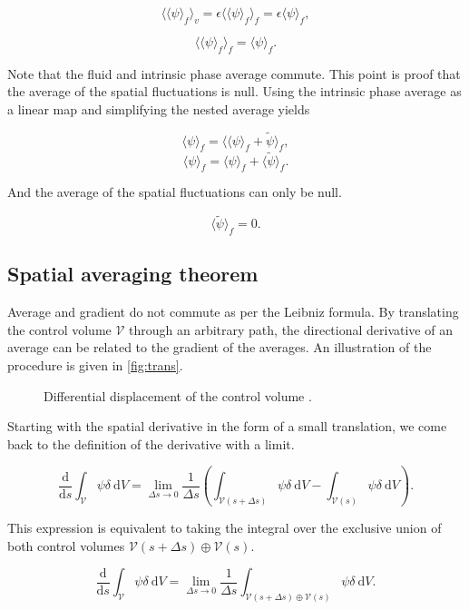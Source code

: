 \documentclass[a4paper,11pt]{article}
\begin{document}
$$\langle\langle\psi\rangle_f\rangle_v = \epsilon\langle\langle\psi\rangle_f\rangle_f = \epsilon\langle\psi\rangle_f,$$

$$\langle\langle\psi\rangle_f\rangle_f = \langle\psi\rangle_f.$$

Note that the fluid and intrinsic phase average commute. This point is proof that the average of the spatial fluctuations is null.
Using the intrinsic phase average as a linear map and simplifying the nested average yields

$$\langle\psi\rangle_f = \langle\langle\psi\rangle_f + \tilde\psi\rangle_f,$$
$$\langle\psi\rangle_f = \langle\psi\rangle_f + \langle\tilde\psi\rangle_f.$$

And the average of the spatial fluctuations can only be null.

\begin{equation}\label{eq:average-fluctuation}
  \boxed{\langle\tilde\psi\rangle_f=0.}
\end{equation}

\subsection{Spatial averaging theorem}

Average and gradient do not commute as per the Leibniz formula.
By translating the control volume $\mathcal V$ through an arbitrary path, the directional derivative of an average can be related to the gradient of the averages.
An illustration of the procedure is given in \autoref{fig:trans}.

\begin{figure}
  \centering
  
  \caption{Differential displacement of the control volume \citep{Whitaker1999}.\label{fig:trans}}
\end{figure}

Starting with the spatial derivative in the form of a small translation, we come back to the definition of the derivative with a limit.

$$\frac{\mathrm d}{\mathrm d s}\int_{\mathcal V}\psi\delta~\mathrm dV = \lim_{\Delta s\to 0}\frac{1}{\Delta s}\left(\int_{\mathcal V(s+\Delta s)}\psi\delta~\mathrm dV - \int_{\mathcal V(s)}\psi\delta~\mathrm dV\right).$$

This expression is equivalent to taking the integral over the exclusive union of both control volumes ${\mathcal V(s+\Delta s)\oplus\mathcal V(s)}$.

$$\frac{\mathrm d}{\mathrm d s}\int_{\mathcal V}\psi\delta~\mathrm dV = \lim_{\Delta s\to 0}\frac{1}{\Delta s}\int_{\mathcal V(s+\Delta s)\oplus\mathcal V(s)}\psi\delta~\mathrm dV.$$
\end{document}
